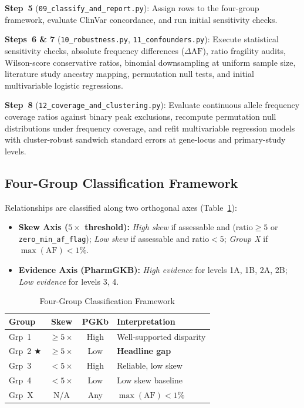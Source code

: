 \documentclass[conference]{IEEEtran}
\begin{document}
\textbf{Step~5} (\texttt{09\_classify\_and\_report.py}):
Assign rows to the four-group framework, evaluate ClinVar concordance, and run initial sensitivity checks.

\textbf{Steps~6 \& 7} (\texttt{10\_robustness.py}, \texttt{11\_confounders.py}):
Execute statistical sensitivity checks, absolute frequency differences ($\Delta\text{AF}$), ratio fragility audits, Wilson-score conservative ratios, binomial downsampling at uniform sample size, literature study ancestry mapping, permutation null tests, and initial multivariable logistic regressions.

\textbf{Step~8} (\texttt{12\_coverage\_and\_clustering.py}):
Evaluate continuous allele frequency coverage ratios against binary peak exclusions, recompute permutation null distributions under frequency coverage, and refit multivariable regression models with cluster-robust sandwich standard errors at gene-locus and primary-study levels.

\subsection{Four-Group Classification Framework}
\label{sec:framework}

Relationships are classified along two orthogonal axes (Table~\ref{tab:framework}):
\begin{itemize}
    \item \textbf{Skew Axis ($5\times$ threshold):} \emph{High skew} if assessable and ($\text{ratio} \ge 5$ or \texttt{zero\_min\_af\_flag}); \emph{Low skew} if assessable and $\text{ratio} < 5$; \emph{Group X} if $\max(\text{AF}) < 1\%$.
    \item \textbf{Evidence Axis (PharmGKB):} \emph{High evidence} for levels 1A, 1B, 2A, 2B; \emph{Low evidence} for levels 3, 4.
\end{itemize}

\begin{table}[!t]
\centering
\caption{Four-Group Classification Framework}
\label{tab:framework}
\renewcommand{\arraystretch}{1.2}
\begin{tabular}{|l|c|c|p{2.3cm}|}
\hline
\textbf{Group} & \textbf{Skew} & \textbf{PGKb} & \textbf{Interpretation} \\
\hline
\textcolor{group1}{Grp~1} & $\ge 5\times$ & High & Well-supported disparity \\
\hline
\textcolor{group2}{Grp~2} $\bigstar$ & $\ge 5\times$ & Low & \textbf{Headline gap} \\
\hline
\textcolor{group3}{Grp~3} & $< 5\times$ & High & Reliable, low skew \\
\hline
\textcolor{group4}{Grp~4} & $< 5\times$ & Low & Low skew baseline \\
\hline
\textcolor{groupX}{Grp~X} & N/A & Any & $\max(\text{AF}) < 1\%$ \\
\hline
\end{tabular}
\end{table}
\end{document}

